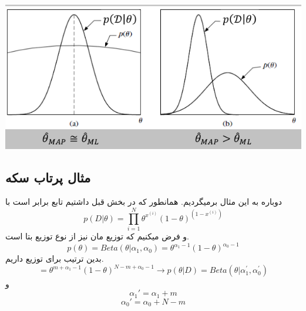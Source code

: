 \documentclass[12pt]{article}
\begin{document}
\includegraphics[width=\textwidth]{figs/MLEvsMAP.png}

\subsection*{مثال پرتاب سکه}
دوباره به این مثال برمیگردیم. همانطور که در بخش قبل داشتیم تابع 
برابر است با 
\[p(D|\theta) = \prod_{i=1}^{N} \theta^{x^{(i)}} (1 - \theta)^{(1 - x^{(i)})}\]
و فرض میکنیم که توزیع 
مان نیز از نوع توزیع بتا است.
\[p(\theta) = Beta(\theta|\alpha_1, \alpha_0) = \theta^{\alpha_1 - 1}(1 - \theta)^{\alpha_0 -1}\]
بدین ترتیب برای توزیع 
داریم.
\[= \theta^{m + \alpha_1 - 1}(1 - \theta)^{N - m + \alpha_0 - 1} \xrightarrow[]{} p(\theta|D) = Beta(\theta|\alpha_1^{'}, \alpha_0^{'})\]
و 
\[
\alpha_1' = \alpha_1 + m\]
\[\alpha_0' = \alpha_0 + N - m
\]
\end{document}
